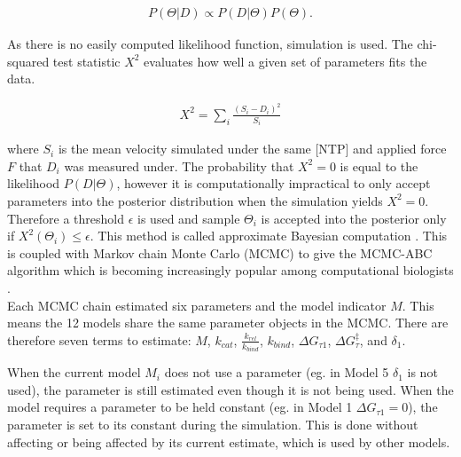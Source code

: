 \documentclass[10pt,letterpaper]{article}
\begin{document}
\begin{eqnarray}
    P(\Theta | D) \propto P(D | \Theta) P(\Theta).
\end{eqnarray}

As there is no easily computed likelihood function, simulation is used. The chi-squared test statistic $X^2$  evaluates how well a given set of parameters fits the data.

\begin{eqnarray}
    X^2 = \sum\limits_{i} \frac{(S_i - D_i)^2}{S_i}
\end{eqnarray}

where $S_i$ is the mean velocity simulated under the same [NTP] and applied force $F$ that $D_i$ was measured under. The probability that $X^2=0$ is equal to the likelihood $P(D | \Theta)$, however it is computationally impractical to only accept parameters into the posterior distribution when the simulation yields $X^2=0$. Therefore a threshold $\epsilon$ is used and sample $\Theta_i$ is accepted into the posterior only if $X^2(\Theta_i) \leq \epsilon$. This method is called approximate Bayesian computation \cite{beaumont2010approximate, csillery2010approximate}. This is coupled with Markov chain Monte Carlo (MCMC) to give the MCMC-ABC algorithm which is becoming increasingly popular among computational biologists \cite{beaumont2010approximate, ratmann2007using}.  \\





Each MCMC chain estimated six parameters and the model indicator $M$. This means the 12 models share the same parameter objects in the MCMC. There are therefore seven terms to estimate: $M$, $k_{cat}$, $\frac{k_{rel}}{k_{bind}}$, $k_{bind}$, $\Delta G_{\tau 1}$, $\Delta G^\ddag_\tau$, and $\delta_1$.


When the current model $M_i$ does not use a parameter (eg. in Model 5 $\delta_1$ is not used), the parameter is still estimated even though it is not being used. When the model requires a parameter to be held constant (eg. in Model 1 $\Delta G_{\tau 1} = 0$), the parameter is set to its constant during the simulation. This is done without affecting or being affected by its current estimate, which is used by other models.


\end{document}
